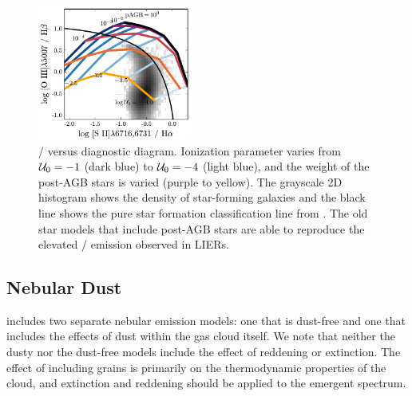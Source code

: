 \begin{figure}[!htbp]
  \begin{centering}
    \includegraphics[width=0.45\textwidth]{manuscript/chapter2/f29.pdf}
    \caption{\sii{}/\ha{} versus \oiiihb{} diagnostic diagram. Ionization parameter varies from $\mathcal{U}_{0}=-1$ (dark blue) to $\mathcal{U}_{0}=-4$ (light blue), and the weight of the post-AGB stars is varied (purple to yellow). The grayscale 2D histogram shows the density of star-forming galaxies and the black line shows the pure star formation classification line from \citet{Kauffmann03a}. The old star models that include post-AGB stars are able to reproduce the elevated \sii{}/\ha{} emission observed in LIERs.}
    \label{fig:lier}
  \end{centering}
\end{figure}

\subsection{Nebular Dust}\label{sec:secondary:dust}

\FSPS includes two separate nebular emission models: one that is dust-free and one that includes the effects of dust within the gas cloud itself. We note that neither the dusty nor the dust-free models include the effect of reddening or extinction. The effect of including grains is primarily on the thermodynamic properties of the cloud, and extinction and reddening should be applied to the emergent spectrum.

